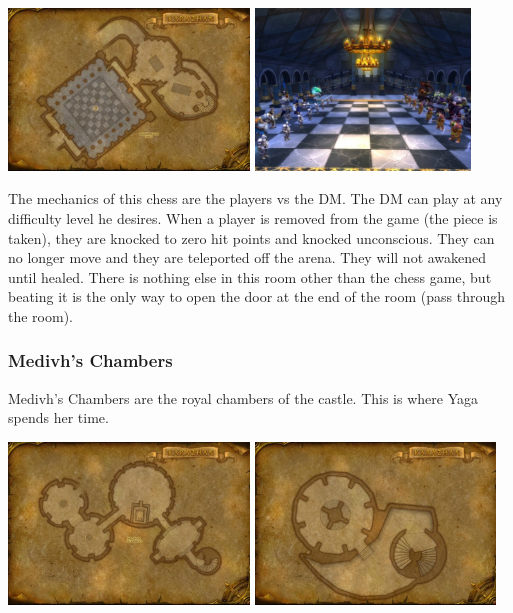\begin{center}
	\includegraphics[width=0.48\textwidth]{img/Karazhan/cropped-3457-14.jpg} \includegraphics[width=0.43\textwidth]{img/Karazhan/22268-karazhan-gamesmans-hall-this-is-where-you-do-the-chess-event-after-beating-the-e.jpg}
\end{center}

The mechanics of this chess are the players vs the DM. The DM can play at any difficulty level he desires. When a player is removed from the game (the piece is taken), they are knocked to zero hit points and knocked unconscious. They can no longer move and they are teleported off the arena. They will not awakened until healed. There is nothing else in this room other than the chess game, but beating it is the only way to open the door at the end of the room (pass through the room).

\subsubsection{Medivh's Chambers}

Medivh's Chambers are the royal chambers of the castle. This is where Yaga spends her time.

\begin{center}
	\includegraphics[width=0.48\textwidth]{img/Karazhan/cropped-3457-15.jpg}
	\includegraphics[width=0.48\textwidth]{img/Karazhan/cropped-3457-16.jpg}
\end{center}

